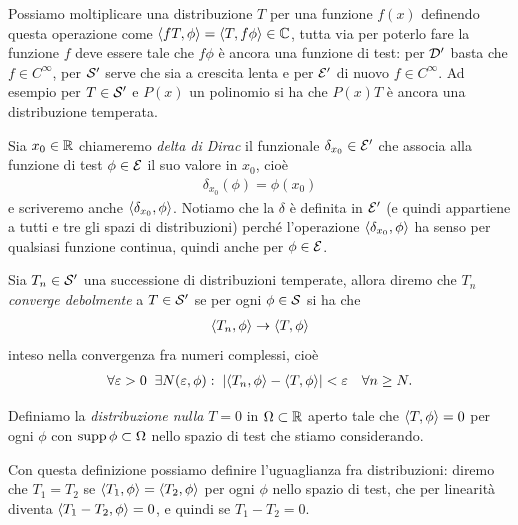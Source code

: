 Possiamo moltiplicare una distribuzione $ T $ per una funzione $ f(x) $ definendo questa operazione come $ \sc{f T,\phi } = \sc{T, f\phi} \in \C $, 
tutta via per poterlo fare la funzione $ f $ deve essere tale che $ f\phi $ è ancora una funzione di test: per $ \D' $ basta che $ f \in C^\infty $, 
per $ \S' $ serve che sia a crescita lenta e per $ \E' $ di nuovo $ f \in C^\infty $. 
Ad esempio per $ T \in \S' $ e $ P(x) $ un polinomio si ha che $ P(x) T $ è ancora una distribuzione temperata.

\begin{definition}
  Sia $ x_0 \in \R $ chiameremo \textit{delta di Dirac} il funzionale $ \delta_{x_0} \in \E' $ che associa alla funzione di test $ \phi \in \E $ il 
  suo valore in $ x_0 $, cioè
  \begin{align}
    \delta_{x_0}(\phi) = \phi(x_0)
  \end{align}
  e scriveremo anche $ \sc{\delta_{x_0}, \phi} $. 
  Notiamo che la $ \delta $ è definita in $ \E' $ (e quindi appartiene a tutti e tre gli spazi di distribuzioni) perché l'operazione 
  $ \sc{\delta_{x_0}, \phi} $ ha senso per qualsiasi funzione continua, quindi anche per $ \phi \in \E $.
\end{definition}

\begin{definition}
  Sia $ T_n \in \S' $ una successione di distribuzioni temperate, allora diremo che $ T_n $ \textit{converge debolmente} a $ T \in \S' $ se per ogni 
  $ \phi \in \S $ si ha che 
  \begin{align}
    \sc{T_n, \phi} \to \sc{T,\phi}
  \end{align}
  inteso nella convergenza fra numeri complessi, cioè 
  \begin{align}
    \forall \eps > 0 \;\; \exists N(\eps, \phi) : \;\abs{ \sc{T_n, \phi} - \sc{T,\phi}} < \eps \quad \forall n \geq N.
  \end{align}
\end{definition}

\begin{definition}
  Definiamo la \textit{distribuzione nulla} $ T = 0 $ in $ \Omega \subset \R $ aperto tale che $ \sc{T, \phi} = 0 $ per ogni $ \phi $ con 
  $ \supp \phi \subset \Omega $ nello spazio di test che stiamo considerando.
\end{definition}

Con questa definizione possiamo definire l'uguaglianza fra distribuzioni: diremo che $ T_1 = T_2 $ se $ \sc{T_1, \phi} = \sc{T_2, \phi} $ 
per ogni $ \phi $ nello spazio di test, che per linearità diventa $ \sc{T_1 - T_2, \phi} = 0 $, e quindi se $ T_1 - T_2 = 0 $.

